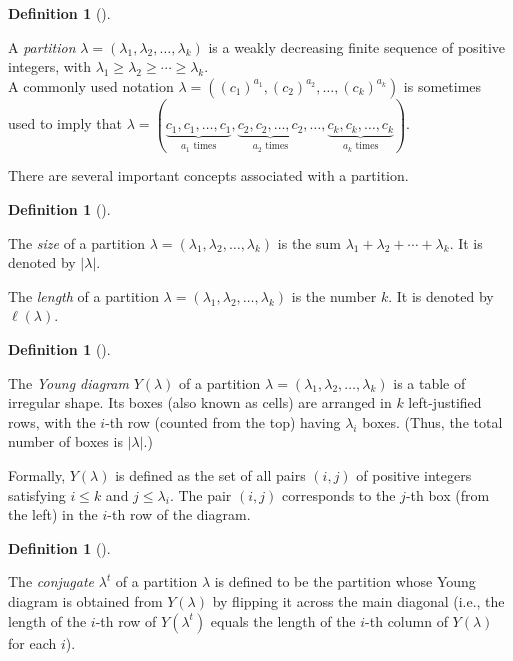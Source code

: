 \documentclass[numbers=enddot,12pt,final,onecolumn,notitlepage]{scrartcl}%
\theoremstyle{definition}
\newtheorem{defi}[theo]{Definition}
\newenvironment{definition}[1][]
{\begin{defi}[#1]\begin{leftbar}}
{\end{leftbar}\end{defi}}
\newcommand{\abs}[1]{\left| #1 \right|}
\newcommand{\tup}[1]{\left( #1 \right)}
\renewcommand{\leq}{\leqslant}
\renewcommand{\geq}{\geqslant}
\theoremstyle{plainsl}
\begin{document}
\begin{definition}
A \emph{partition} $\lambda = \left(\lambda_1, \lambda_2, \ldots, \lambda_k\right)$ is a
weakly decreasing finite sequence of positive integers, with
$\lambda_1 \geq \lambda_2 \geq \cdots \geq \lambda_k$. \\

A commonly used notation $\lambda =((c_1)^{a_1}, (c_2)^{a_2}, \ldots, (c_k)^{a_k})$  is sometimes used to imply that $\lambda = ( \underbrace{c_1,c_1,\ldots,c_1}_{a_1
\text{ times}},  \underbrace{c_2,c_2,\ldots,c_2}_{a_2
\text{ times}}, \ldots, \underbrace{c_k,c_k,\ldots,c_k}_{a_k
\text{ times}}
)$.
\end{definition}


There are several important concepts associated with a partition.

\begin{definition}
The \emph{size} of a partition
$\lambda = \left(\lambda_1, \lambda_2, \ldots, \lambda_k\right)$
is the sum $\lambda_1 + \lambda_2 + \cdots + \lambda_k$.
It is denoted by $\abs{\lambda}$.

The \emph{length} of a partition
$\lambda = \left(\lambda_1, \lambda_2, \ldots, \lambda_k\right)$
is the number $k$.
It is denoted by $\ell\tup{\lambda}$.
\end{definition}

\begin{definition}
The \emph{Young diagram} $Y\tup{\lambda}$ of a partition
$\lambda = \left(\lambda_1, \lambda_2, \ldots, \lambda_k\right)$
is a table of irregular shape.
Its boxes (also known as cells) are arranged in
$k$ left-justified rows, with the $i$-th row (counted from the top)
having $\lambda_i$ boxes. (Thus, the total number of boxes
is $\abs{\lambda}$.)

Formally, $Y\tup{\lambda}$ is defined as the set of all pairs
$\tup{i, j}$ of positive integers satisfying $i \leq k$ and
$j \leq \lambda_i$. The pair $\tup{i, j}$ corresponds to the
$j$-th box (from the left) in the $i$-th row of the diagram.
\end{definition}

\begin{definition}
The \emph{conjugate} $\lambda^t$ of a partition $\lambda$ is defined to be the partition whose Young diagram is obtained from $Y\tup{\lambda}$ by flipping it across the main diagonal (i.e., the length of the $i$-th row of $Y\tup{\lambda^t}$ equals the length of the $i$-th column of $Y\tup{\lambda}$ for each $i$).
\end{definition} 
\end{document}
